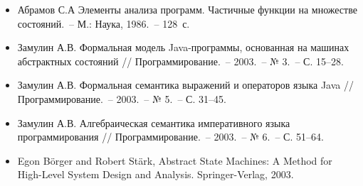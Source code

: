 \documentclass[landscape]{slides}
\begin{document}
\begin{slide}
\begin{itemize}
\item Абрамов С.А  Элементы анализа программ. Частичные функции на множестве состояний.~-- М.: Наука, 1986.~-- 128~с.
\item Замулин А.В. Формальная модель Java-программы, основанная на машинах абстрактных состояний // Программирование.~-- 2003.~-- № 3.~-- С. 15–28.
\item Замулин А.В. Формальная семантика выражений и операторов языка Java // Программирование.~-- 2003.~-- № 5.~-- С. 31–45.
\item Замулин А.В. Алгебраическая семантика императивного языка программирования // Программирование.~-- 2003.~-- № 6.~-- С. 51–64.
\item Egon Börger and Robert Stärk, Abstract State Machines: A Method for High-Level System Design and Analysis. Springer-Verlag, 2003.
\end{itemize}
\end{slide}
\end{document}
